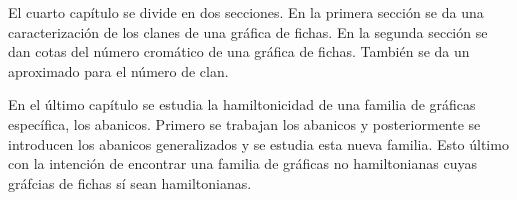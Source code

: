 El cuarto cap\'itulo se  divide en dos secciones. En la primera secci\'on se da
una caracterizaci\'on de los clanes de una gr\'afica de fichas. En la segunda
secci\'on se dan cotas del n\'umero crom\'atico de una gr\'afica de fichas.
Tambi\'en se da un aproximado para el n\'umero de clan.

En el \'ultimo cap\'itulo se estudia la hamiltonicidad de una familia de
gr\'aficas espec\'ifica, los abanicos. Primero se trabajan los abanicos y
posteriormente se introducen los abanicos generalizados y se estudia esta nueva
familia. Esto \'ultimo con la intenci\'on de encontrar una familia de gr\'aficas
no hamiltonianas cuyas gr\'afcias de fichas s\'i sean hamiltonianas.
